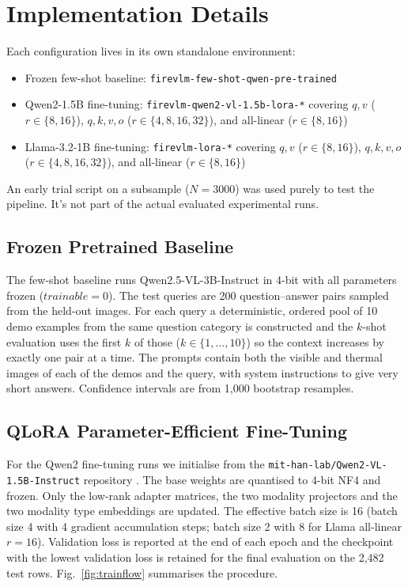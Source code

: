 \documentclass[12pt]{report}
\begin{document}
\section{Implementation Details}
Each configuration lives in its own standalone environment:
\begin{itemize}[leftmargin=0.5in, itemsep=2pt]
  \item Frozen few-shot baseline: \texttt{firevlm-few-shot-qwen-pre-trained}
  \item Qwen2-1.5B fine-tuning: \texttt{firevlm-qwen2-vl-1.5b-lora-*} covering $q,v$ ($r\in\{8, 16\}$), $q,k,v,o$ ($r\in\{4, 8, 16, 32\}$), and all-linear ($r\in\{8, 16\}$)
  \item Llama-3.2-1B fine-tuning: \texttt{firevlm-lora-*} covering $q,v$ ($r\in\{8, 16\}$), $q,k,v,o$ ($r\in\{4, 8, 16, 32\}$), and all-linear ($r\in\{8, 16\}$)
\end{itemize}
An early trial script on a subsample ($N=3000$) was used purely to test the pipeline. It's not part of the actual evaluated experimental runs.

\subsection{Frozen Pretrained Baseline}
The few-shot baseline runs Qwen2.5-VL-3B-Instruct in 4-bit with all parameters frozen ($trainable = 0$). The test queries are 200 question--answer pairs sampled from the held-out images. For each query a deterministic, ordered pool of 10 demo examples from the same question category is constructed and the $k$-shot evaluation uses the first $k$ of those ($k \in \{1, \dots, 10\}$) so the context increases by exactly one pair at a time. The prompts contain both the visible and thermal images of each of the demos and the query, with system instructions to give very short answers. Confidence intervals are from 1,000 bootstrap resamples.

\subsection{QLoRA Parameter-Efficient Fine-Tuning}
For the Qwen2 fine-tuning runs we initialise from the \texttt{mit-han-lab/\allowbreak Qwen2-VL-1.5B-Instruct} repository \cite{mithan}.
The base weights are quantised to 4-bit NF4 and frozen. Only the low-rank adapter matrices, the two modality projectors and the two modality type embeddings are updated. The effective batch size is 16 (batch size 4 with 4 gradient accumulation steps; batch size 2 with 8 for Llama all-linear $r{=}16$). Validation loss is reported at the end of each epoch and the checkpoint with the lowest validation loss is retained for the final evaluation on the 2,482 test rows. Fig.~\ref{fig:trainflow} summarises the procedure.
\end{document}
